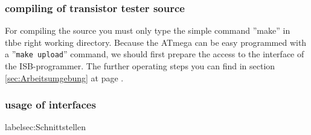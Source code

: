 \subsubsection{compiling of transistor tester source}
For compiling the source you must only type the simple command ''make''
in thbe right working directory.
Because the ATmega can be easy programmed with a ''\verb"make upload"'' command,
we should first prepare the access to the interface of the ISB-programmer.
The further operating steps you can find in section \ref{sec:Arbeitsumgebung}
at page \pageref{sec:arbeitsumgebung}.

\subsubsection{usage of interfaces}
label{sec:Schnittstellen}

